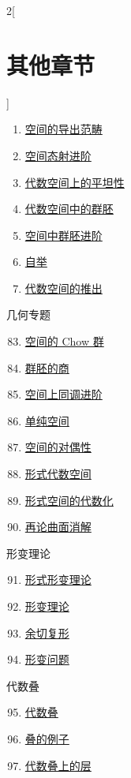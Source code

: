 \begin{multicols}{2}[\section{其他章节}]
\begin{enumerate}
\item \hyperref[spaces-perfect-section-phantom]{空间的导出范畴}
\item \hyperref[spaces-more-morphisms-section-phantom]{空间态射进阶}
\item \hyperref[spaces-flat-section-phantom]{代数空间上的平坦性}
\item \hyperref[spaces-groupoids-section-phantom]{代数空间中的群胚}
\item \hyperref[spaces-more-groupoids-section-phantom]{空间中群胚进阶}
\item \hyperref[bootstrap-section-phantom]{自举}
\item \hyperref[spaces-pushouts-section-phantom]{代数空间的推出}
\end{enumerate}
几何专题
\begin{enumerate}
\setcounter{enumi}{82}
\item \hyperref[spaces-chow-section-phantom]{空间的 Chow 群}
\item \hyperref[groupoids-quotients-section-phantom]{群胚的商}
\item \hyperref[spaces-more-cohomology-section-phantom]{空间上同调进阶}
\item \hyperref[spaces-simplicial-section-phantom]{单纯空间}
\item \hyperref[spaces-duality-section-phantom]{空间的对偶性}
\item \hyperref[formal-spaces-section-phantom]{形式代数空间}
\item \hyperref[restricted-section-phantom]{形式空间的代数化}
\item \hyperref[spaces-resolve-section-phantom]{再论曲面消解}
\end{enumerate}
形变理论
\begin{enumerate}
\setcounter{enumi}{90}
\item \hyperref[formal-defos-section-phantom]{形式形变理论}
\item \hyperref[defos-section-phantom]{形变理论}
\item \hyperref[cotangent-section-phantom]{余切复形}
\item \hyperref[examples-defos-section-phantom]{形变问题}
\end{enumerate}
代数叠
\begin{enumerate}
\setcounter{enumi}{94}
\item \hyperref[algebraic-section-phantom]{代数叠}
\item \hyperref[examples-stacks-section-phantom]{叠的例子}
\item \hyperref[stacks-sheaves-section-phantom]{代数叠上的层}

\end{enumerate}
\end{multicols}
